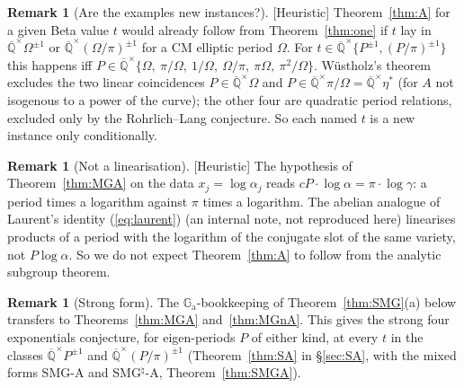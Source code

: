 \documentclass[11pt]{amsart}
\theoremstyle{definition}
\newtheorem{remark}[theorem]{Remark}
\newcommand{\Qb}{\overline{\mathbb{Q}}}
\newcommand{\Ga}{\mathbb{G}_{\mathrm a}}
\newcommand{\lab}[1]{\textup{[#1]}}
\begin{document}
\begin{remark}[Are the examples new instances?]\label{rem:newinst}
\lab{Heuristic} Theorem~\ref{thm:A} for a given Beta value $t$ would already follow from Theorem~\ref{thm:one} if $t$ lay in
$\Qb^\times\Omega^{\pm1}$ or $\Qb^\times(\Omega/\pi)^{\pm1}$ for a CM elliptic period $\Omega$. For
$t\in\Qb^\times\{P^{\pm1},(P/\pi)^{\pm1}\}$ this happens iff $P\in\Qb^\times\{\Omega,\ \pi/\Omega,\ 1/\Omega,\ \Omega/\pi,\
\pi\Omega,\ \pi^2/\Omega\}$. W\"ustholz's theorem excludes the two linear coincidences $P\in\Qb^\times\Omega$ and
$P\in\Qb^\times\pi/\Omega=\Qb^\times\eta^*$ (for $A$ not isogenous to a power of the curve); the other four are quadratic period
relations, excluded only by the Rohrlich--Lang conjecture. So each named $t$ is a new instance only
conditionally.
\end{remark}

\begin{remark}[Not a linearisation]\label{rem:notlinA}
\lab{Heuristic} The hypothesis of Theorem~\ref{thm:MGA} on the data $x_j=\log\alpha_j$ reads $cP\cdot\log\alpha=\pi\cdot
\log\gamma$: a period times a logarithm against $\pi$ times a logarithm. The abelian analogue of Laurent's identity
(\ref{eq:laurent}) (an internal note, not reproduced here) linearises products of a period with the logarithm of the
conjugate slot of the same variety, not $P\log\alpha$. So we do not expect Theorem~\ref{thm:A} to follow from the
analytic subgroup theorem.
\end{remark}

\begin{remark}[Strong form]
The $\Ga$-bookkeeping of Theorem~\ref{thm:SMG}(a) below transfers to Theorems~\ref{thm:MGA} and~\ref{thm:MGnA}. This gives the strong four exponentials conjecture, for eigen-periods $P$ of either kind,
at every $t$ in the classes $\Qb^\times P^{\pm1}$ and $\Qb^\times(P/\pi)^{\pm1}$ (Theorem~\ref{thm:SA} in \S\ref{sec:SA}, with the mixed forms SMG-A and SMG$^\natural$-A, Theorem~\ref{thm:SMGA}).
\end{remark}
\end{document}

